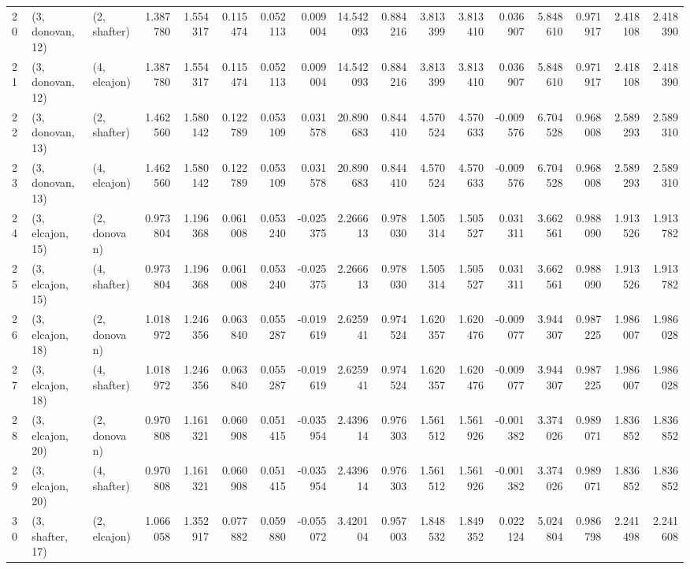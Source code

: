 \begin{tabular}{lllrrrrrrrrrrrrrr}
20 &  (3, donovan, 12) &     (2, shafter) &  1.387780 &  1.554317 &   0.115474 &  0.052113 &  0.009004 &  14.542093 &  0.884216 &   3.813399 &  3.813410 &  0.036907 &   5.848610 &  0.971917 &  2.418108 &  2.418390 \\
21 &  (3, donovan, 12) &     (4, elcajon) &  1.387780 &  1.554317 &   0.115474 &  0.052113 &  0.009004 &  14.542093 &  0.884216 &   3.813399 &  3.813410 &  0.036907 &   5.848610 &  0.971917 &  2.418108 &  2.418390 \\
22 &  (3, donovan, 13) &     (2, shafter) &  1.462560 &  1.580142 &   0.122789 &  0.053109 &  0.031578 &  20.890683 &  0.844410 &   4.570524 &  4.570633 & -0.009576 &   6.704528 &  0.968008 &  2.589293 &  2.589310 \\
23 &  (3, donovan, 13) &     (4, elcajon) &  1.462560 &  1.580142 &   0.122789 &  0.053109 &  0.031578 &  20.890683 &  0.844410 &   4.570524 &  4.570633 & -0.009576 &   6.704528 &  0.968008 &  2.589293 &  2.589310 \\
24 &  (3, elcajon, 15) &     (2, donovan) &  0.973804 &  1.196368 &   0.061008 &  0.053240 & -0.025375 &   2.266613 &  0.978030 &   1.505314 &  1.505527 &  0.031311 &   3.662561 &  0.988090 &  1.913526 &  1.913782 \\
25 &  (3, elcajon, 15) &     (4, shafter) &  0.973804 &  1.196368 &   0.061008 &  0.053240 & -0.025375 &   2.266613 &  0.978030 &   1.505314 &  1.505527 &  0.031311 &   3.662561 &  0.988090 &  1.913526 &  1.913782 \\
26 &  (3, elcajon, 18) &     (2, donovan) &  1.018972 &  1.246356 &   0.063840 &  0.055287 & -0.019619 &   2.625941 &  0.974524 &   1.620357 &  1.620476 & -0.009077 &   3.944307 &  0.987225 &  1.986007 &  1.986028 \\
27 &  (3, elcajon, 18) &     (4, shafter) &  1.018972 &  1.246356 &   0.063840 &  0.055287 & -0.019619 &   2.625941 &  0.974524 &   1.620357 &  1.620476 & -0.009077 &   3.944307 &  0.987225 &  1.986007 &  1.986028 \\
28 &  (3, elcajon, 20) &     (2, donovan) &  0.970808 &  1.161321 &   0.060908 &  0.051415 & -0.035954 &   2.439614 &  0.976303 &   1.561512 &  1.561926 & -0.001382 &   3.374026 &  0.989071 &  1.836852 &  1.836852 \\
29 &  (3, elcajon, 20) &     (4, shafter) &  0.970808 &  1.161321 &   0.060908 &  0.051415 & -0.035954 &   2.439614 &  0.976303 &   1.561512 &  1.561926 & -0.001382 &   3.374026 &  0.989071 &  1.836852 &  1.836852 \\
30 &  (3, shafter, 17) &     (2, elcajon) &  1.066058 &  1.352917 &   0.077882 &  0.059880 & -0.055072 &   3.420104 &  0.957003 &   1.848532 &  1.849352 &  0.022124 &   5.024804 &  0.986798 &  2.241498 &  2.241608 \\

\end{tabular}
